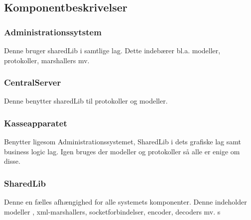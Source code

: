 \subsection{Komponentbeskrivelser}

\subsubsection{Administrationssytstem} Denne bruger sharedLib i samtlige lag. Dette indebærer bl.a. modeller, protokoller, marshallers mv.

\subsubsection{CentralServer} Denne benytter sharedLib til protokoller og modeller.

\subsubsection{Kasseapparatet} Benytter ligesom Administrationssystemet, SharedLib i dets grafiske lag samt business logic lag. Igen bruges der modeller og protokoller så alle er enige om disse.

\subsubsection{SharedLib}
Denne en fælles afhængighed for alle systemets komponenter. Denne indeholder modeller
, xml-marshallers, socketforbindelser, encoder, decoders mv. s